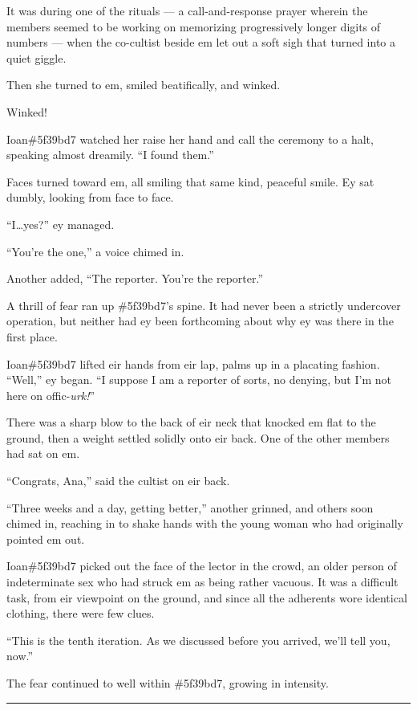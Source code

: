 It was during one of the rituals --- a call-and-response prayer wherein the members seemed to be working on memorizing progressively longer digits of numbers --- when the co-cultist beside em let out a soft sigh that turned into a quiet giggle.

Then she turned to em, smiled beatifically, and winked.

Winked!

Ioan\#5f39bd7 watched her raise her hand and call the ceremony to a halt, speaking almost dreamily. ``I found them.''

Faces turned toward em, all smiling that same kind, peaceful smile. Ey sat dumbly, looking from face to face.

``I\ldots{}yes?'' ey managed.

``You're the one,'' a voice chimed in.

Another added, ``The reporter. You're the reporter.''

A thrill of fear ran up \#5f39bd7's spine. It had never been a strictly undercover operation, but neither had ey been forthcoming about why ey was there in the first place.

Ioan\#5f39bd7 lifted eir hands from eir lap, palms up in a placating fashion. ``Well,'' ey began. ``I suppose I am a reporter of sorts, no denying, but I'm not here on offic-\emph{urk!}''

There was a sharp blow to the back of eir neck that knocked em flat to the ground, then a weight settled solidly onto eir back. One of the other members had sat on em.

``Congrats, Ana,'' said the cultist on eir back.

``Three weeks and a day, getting better,'' another grinned, and others soon chimed in, reaching in to shake hands with the young woman who had originally pointed em out.

Ioan\#5f39bd7 picked out the face of the lector in the crowd, an older person of indeterminate sex who had struck em as being rather vacuous. It was a difficult task, from eir viewpoint on the ground, and since all the adherents wore identical clothing, there were few clues.

``This is the tenth iteration. As we discussed before you arrived, we'll tell you, now.''

The fear continued to well within \#5f39bd7, growing in intensity.

\begin{center}\rule{0.5\linewidth}{\linethickness}\end{center}

